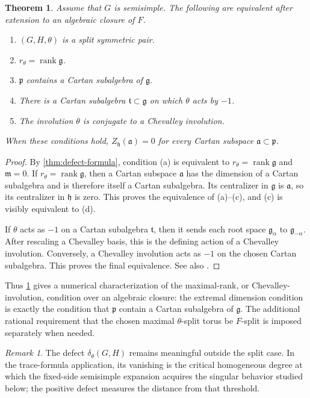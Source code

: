 \documentclass[11pt]{amsart}
\newtheorem{theorem}{Theorem}[section]
\theoremstyle{definition}
\theoremstyle{remark}
\newtheorem{remark}[remark]{Remark}
\newcommand{\rank}{\operatorname{rank}}
\newcommand{\g}{\mathfrak g}
\newcommand{\h}{\mathfrak h}
\newcommand{\p}{\mathfrak p}
\newcommand{\aA}{\mathfrak a}
\newcommand{\tT}{\mathfrak t}
\newcommand{\mM}{\mathfrak m}
\begin{document}
\begin{theorem}\label{thm:split-symmetric-equivalences}
Assume that $G$ is semisimple.  The following are equivalent after extension
to an algebraic closure of $F$.
\begin{enumerate}[label=\textup{(\alph*)},leftmargin=2.3em]
\item $(G,H,\theta)$ is a split symmetric pair.
\item $r_\theta=\rank\g$.
\item $\p$ contains a Cartan subalgebra of $\g$.
\item There is a Cartan subalgebra $\tT\subset\g$ on which $\theta$ acts by
      $-1$.
\item The involution $\theta$ is conjugate to a Chevalley involution.
\end{enumerate}
When these conditions hold, $Z_\h(\aA)=0$ for every Cartan subspace
$\aA\subset\p$.
\end{theorem}

\begin{proof}
By \cref{thm:defect-formula}, condition (a) is equivalent to
$r_\theta=\rank\g$ and $\mM=0$.  If $r_\theta=\rank\g$, then a Cartan subspace
$\aA$ has the dimension of a Cartan subalgebra and is therefore itself a
Cartan subalgebra.  Its centralizer in $\g$ is $\aA$, so its centralizer in
$\h$ is zero.  This proves the equivalence of (a)--(c), and (c) is visibly
equivalent to (d).

If $\theta$ acts as $-1$ on a Cartan subalgebra $\tT$, then it sends each root
space $\g_\alpha$ to $\g_{-\alpha}$.  After rescaling a Chevalley basis, this
is the defining action of a Chevalley involution.  Conversely, a Chevalley
involution acts as $-1$ on the chosen Cartan subalgebra.  This proves the final
equivalence.  See also \cite{KostantRallis,HelminckWang}.
\end{proof}

Thus \cref{thm:split-symmetric-equivalences} gives a numerical
characterization of the maximal-rank, or Chevalley-involution, condition over
an algebraic closure: the extremal dimension condition is exactly the
condition that $\p$ contain a Cartan subalgebra of $\g$.  The additional
rational requirement that the chosen maximal $\theta$-split torus be
$F$-split is imposed separately when needed.

\begin{remark}
The defect $\delta_\theta(G,H)$ remains meaningful outside the split case.
In the trace-formula application, its vanishing is the critical homogeneous
degree at which the fixed-side semisimple expansion acquires the singular
behavior studied below; the positive defect measures the distance from that
threshold.
\end{remark}
\end{document}
